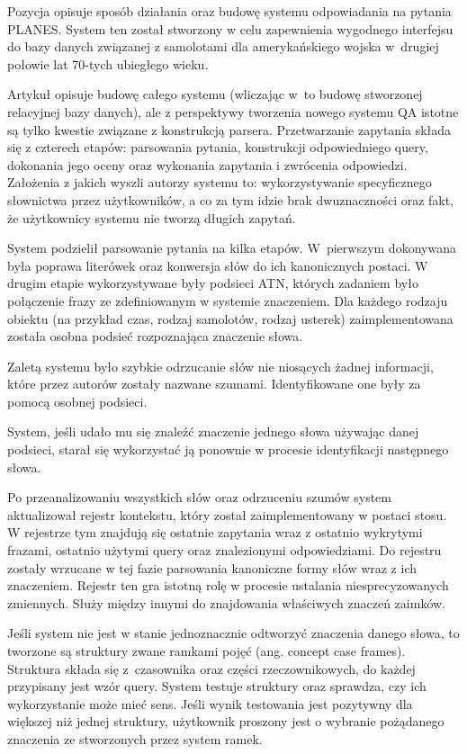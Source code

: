 Pozycja \cite{waltz1978english} opisuje sposób działania oraz budowę systemu odpowiadania na pytania PLANES. System ten został stworzony w celu zapewnienia wygodnego interfejsu do bazy danych związanej z samolotami dla amerykańskiego wojska w~drugiej połowie lat 70-tych ubiegłego wieku.

Artykuł \cite{waltz1978english} opisuje budowę całego systemu (wliczając w~to budowę stworzonej relacyjnej bazy danych), ale z perspektywy tworzenia nowego systemu QA istotne są tylko kwestie związane z konstrukcją parsera. Przetwarzanie zapytania składa się z czterech etapów: parsowania pytania, konstrukcji odpowiedniego query, dokonania jego oceny oraz wykonania zapytania i zwrócenia odpowiedzi. Założenia z jakich wyszli autorzy systemu to: wykorzystywanie specyficznego słownictwa przez użytkowników, a co za tym idzie brak dwuznaczności oraz fakt, że użytkownicy systemu nie tworzą długich zapytań.

System podzielił parsowanie pytania na kilka etapów. W~pierwszym dokonywana była poprawa literówek oraz konwersja słów do ich kanonicznych postaci. W drugim etapie wykorzystywane były podsieci ATN, których zadaniem było połączenie frazy ze zdefiniowanym w systemie znaczeniem. Dla każdego rodzaju obiektu (na przykład czas, rodzaj samolotów, rodzaj usterek) zaimplementowana została osobna podsieć rozpoznająca znaczenie słowa. 

Zaletą systemu było szybkie odrzucanie słów nie niosących żadnej informacji, które przez autorów \cite{waltz1978english} zostały nazwane szumami. Identyfikowane one były za pomocą osobnej podsieci. 

System, jeśli udało mu się znaleźć znaczenie jednego słowa używając danej podsieci, starał się wykorzystać ją ponownie w procesie identyfikacji następnego słowa.

Po przeanalizowaniu wszystkich słów oraz odrzuceniu szumów system aktualizował rejestr kontekstu, który został zaimplementowany w postaci stosu. W rejestrze tym znajdują się ostatnie zapytania wraz z ostatnio wykrytymi frazami, ostatnio użytymi query oraz znalezionymi odpowiedziami. Do rejestru zostały wrzucane w tej fazie parsowania kanoniczne formy słów wraz z ich znaczeniem. Rejestr ten gra istotną rolę w procesie ustalania niesprecyzowanych zmiennych. Służy między innymi do znajdowania właściwych znaczeń zaimków.

Jeśli system nie jest w stanie jednoznacznie odtworzyć znaczenia danego słowa, to tworzone są struktury zwane ramkami pojęć (ang. concept case frames). Struktura składa się z~czasownika oraz części rzeczownikowych, do każdej przypisany jest wzór query. System testuje struktury oraz sprawdza, czy ich wykorzystanie może mieć sens. Jeśli wynik testowania jest pozytywny dla większej niż jednej struktury, użytkownik proszony jest o wybranie pożądanego znaczenia ze stworzonych przez system ramek.


